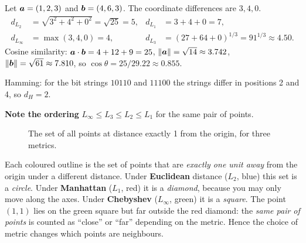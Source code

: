 \begin{example}
Let $\boldsymbol{a}=(1,2,3)$ and $\boldsymbol{b}=(4,6,3)$. The coordinate differences are $3,4,0$.
\begin{align*}
d_{L_2}&=\sqrt{3^2+4^2+0^2}=\sqrt{25}=5, &
d_{L_1}&=3+4+0=7,\\
d_{L_\infty}&=\max(3,4,0)=4, &
d_{L_3}&=(27+64+0)^{1/3}=91^{1/3}\approx4.50.
\end{align*}
Cosine similarity: $\boldsymbol{a}\cdot\boldsymbol{b}=4+12+9=25$, $\|\boldsymbol{a}\|=\sqrt{14}\approx3.742$, $\|\boldsymbol{b}\|=\sqrt{61}\approx7.810$, so $\cos\theta=25/29.22\approx0.855$.\par
Hamming: for the bit strings $10110$ and $11100$ the strings differ in positions 2 and 4, so $d_H=2$.\par
\textbf{Note the ordering} $L_\infty\le L_3\le L_2\le L_1$ for the same pair of points.
\end{example}

\begin{figure}[!htbp]
\centering
{}
\caption{The set of all points at distance exactly 1 from the origin, for three metrics.}\label{fig:unitballs}
\end{figure}

\begin{explain}
Each coloured outline is the set of points that are \emph{exactly one unit away} from the origin under a different distance. Under \textbf{Euclidean} distance ($L_2$, blue) this set is a \emph{circle}. Under \textbf{Manhattan} ($L_1$, red) it is a \emph{diamond}, because you may only move along the axes. Under \textbf{Chebyshev} ($L_\infty$, green) it is a \emph{square}. The point $(1,1)$ lies on the green square but far outside the red diamond: the \emph{same pair of points} is counted as ``close'' or ``far'' depending on the metric. Hence the choice of metric changes which points are neighbours.
\end{explain}


